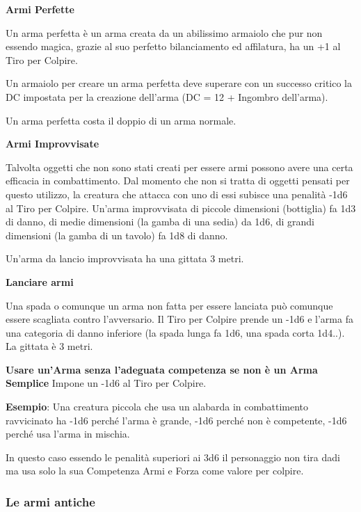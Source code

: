 \begin{multicols}{2}
\medskip

\textbf{Armi Perfette}

Un arma perfetta è un arma creata da un abilissimo armaiolo che pur non essendo magica, grazie al suo perfetto bilanciamento ed affilatura, ha un +1 al Tiro per Colpire.

Un armaiolo per creare un arma perfetta deve superare con un successo critico la DC impostata per la creazione dell'arma (DC = 12 + Ingombro dell'arma).

Un arma perfetta costa il doppio di un arma normale.

\textbf{Armi Improvvisate}\label{armaimprovvisata}\hypertarget{armaimprovvisata}{}

Talvolta oggetti che non sono stati creati per essere armi possono avere una certa efficacia in combattimento. Dal momento che non si tratta di oggetti pensati per questo utilizzo, la creatura che attacca con uno di essi subisce una penalità -1d6 al Tiro per Colpire. Un'arma improvvisata di piccole dimensioni (bottiglia) fa 1d3 di danno, di medie dimensioni (la gamba di una sedia) da 1d6, di grandi dimensioni (la gamba di un tavolo) fa 1d8 di danno.

Un'arma da lancio improvvisata ha una gittata 3 metri.

\medskip

\textbf{Lanciare armi}

Una spada o comunque un arma non fatta per essere lanciata può comunque essere scagliata contro l'avversario. Il Tiro per Colpire prende un -1d6 e l'arma fa una categoria di danno inferiore (la spada lunga fa 1d6, una spada corta 1d4..). La gittata è 3 metri.

\medskip

\textbf{Usare un'Arma senza l'adeguata competenza se non è un Arma Semplice} Impone un -1d6 al Tiro per Colpire.

\textbf{Esempio}: Una creatura piccola che usa un alabarda in combattimento ravvicinato ha -1d6 perché l'arma è grande, -1d6 perché non è competente, -1d6 perché usa l'arma in mischia.

In questo caso essendo le penalità superiori ai 3d6 il personaggio non tira dadi ma usa solo la sua Competenza Armi e Forza come valore per colpire.

\subsubsection{Le armi antiche}


\end{multicols}

